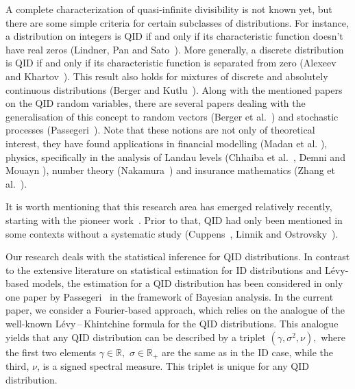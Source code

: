 \documentclass[a4paper,11pt]{article}
\theoremstyle{definition}
\newcommand{\R}{{\mathbb{R}}}
\newcommand{\1}{\mathbb{I}}
\def\R{\mathbb{R}}
\theoremstyle{remark}
\begin{document}
A complete characterization of quasi-infinite divisibility is not known yet, but there are some simple criteria for certain subclasses of distributions. For instance,  a distribution on integers  is QID if and only if its characteristic function doesn't have real zeros (Lindner, Pan and Sato~\cite{LPS2018}). More generally,  a discrete distribution is QID if and only if its characteristic function is separated from zero (Alexeev and Khartov~\cite{AK2023}). This result also holds for  mixtures of discrete and absolutely continuous distributions (Berger and Kutlu~\cite{BK2023}). Along with the mentioned papers on the QID random variables, there are several papers dealing with the generalisation of this concept to random vectors (Berger et al.~\cite{BKL2022}) and stochastic processes (Passegeri~\cite{Pass2020}). Note that these notions are not only of theoretical interest, they  have  found applications in financial modelling (Madan et al. \cite{Madan2023}),  physics, specifically in the analysis of Landau levels (Chhaiba et al.~\cite{Ch2016}, Demni and Mouayn \cite{DM2015}), number theory (Nakamura~\cite{Nakamura}) and insurance mathematics (Zhang et al.~\cite{Zhang2014}). 

It is worth mentioning that  this research area has emerged relatively recently, starting with the pioneer work~\cite{LPS2018}. Prior to that, QID had only been mentioned in some contexts without a systematic study  (Cuppens~\cite{Cuppens}, Linnik and Ostrovsky~\cite{LO1977}). 

Our research deals with the statistical inference for QID distributions. In contrast to the extensive literature on statistical estimation for ID distributions and L{\'e}vy-based models, the estimation for a QID distribution has been considered in only one paper by Passegeri~\cite{Pass2023} in the framework of Bayesian analysis. In the current paper, we consider a Fourier-based approach, which relies on the analogue of the well-known L{\'e}vy\,--\,Khintchine formula for the QID distributions. This analogue yields that any QID distribution can be described by a triplet \((\gamma, \sigma^2, \nu),\) where the first two elements \(\gamma \in \R,\) \(\sigma \in \R_+\) are the same as in the ID case, while the third, \(\nu\), is a signed spectral measure. This triplet is unique for any QID distribution. \newline%
\end{document}
